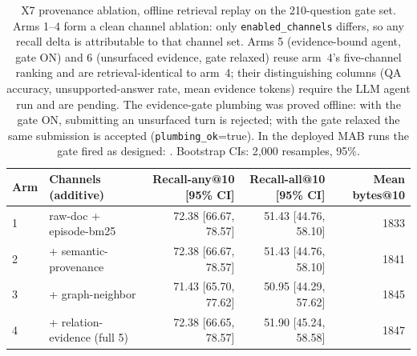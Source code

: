 \begin{table}[t]
\centering
\caption{X7 provenance ablation, offline retrieval replay on the 210-question gate set. Arms 1--4 form a clean channel ablation: only \texttt{enabled\_channels} differs, so any recall delta is attributable to that channel set. Arms 5 (evidence-bound agent, gate ON) and 6 (unsurfaced evidence, gate relaxed) reuse arm~4's five-channel ranking and are retrieval-identical to arm~4; their distinguishing columns (QA accuracy, unsupported-answer rate, mean evidence tokens) require the LLM agent run and are pending. The evidence-gate plumbing was proved offline: with the gate ON, submitting an unsurfaced turn is rejected; with the gate relaxed the same submission is accepted (\texttt{plumbing\_ok}=true). In the deployed MAB runs the gate fired as designed: \GateRejectStats{}. Bootstrap CIs: 2{,}000 resamples, 95\%.}
\label{tab:provenance-ablation}
\small
\setlength{\tabcolsep}{4pt}
\begin{tabular}{llrrr}
\toprule
Arm & Channels (additive) & Recall-any@10 [95\% CI] & Recall-all@10 [95\% CI] & Mean bytes@10 \\
\midrule
1 & raw-doc + episode-bm25 & 72.38 [66.67, 78.57] & 51.43 [44.76, 58.10] & 1833 \\
2 & + semantic-provenance & 72.38 [66.67, 78.57] & 51.43 [44.76, 58.10] & 1841 \\
3 & + graph-neighbor & 71.43 [65.70, 77.62] & 50.95 [44.29, 57.62] & 1845 \\
4 & + relation-evidence (full 5) & 72.38 [66.65, 78.57] & 51.90 [45.24, 58.58] & 1847 \\
\bottomrule
\end{tabular}
\end{table}
